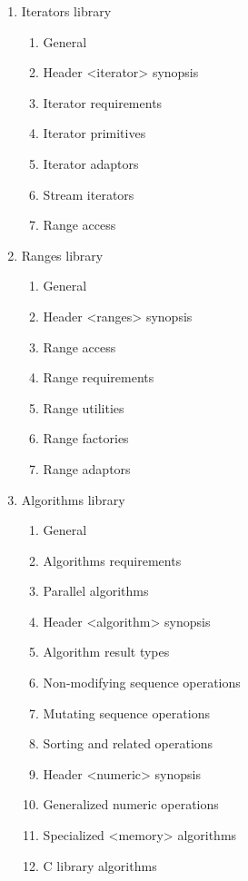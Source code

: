 \begin{enumerate}
\begin{enumerate}[label=\arabic{enumi}.\arabic*.]
     \end{enumerate}
\item Iterators library
    \begin{enumerate}[label=\arabic{enumi}.\arabic*.]
      \item General 
      \item Header <iterator> synopsis
      \item Iterator requirements 
      \item Iterator primitives 
      \item  Iterator adaptors 
      \item Stream iterators 
      \item  Range access
     \end{enumerate}
\item Ranges library
    \begin{enumerate}[label=\arabic{enumi}.\arabic*.]
      \item General       
      \item Header <ranges> synopsis
      \item Range access 
      \item Range requirements 
      \item Range utilities 
      \item Range factories 
      \item Range adaptors
     \end{enumerate}
\item Algorithms library
    \begin{enumerate}[label=\arabic{enumi}.\arabic*.]
      \item  General 
      \item  Algorithms requirements 
      \item Parallel algorithms 
      \item Header <algorithm> synopsis 
      \item Algorithm result types 
      \item Non-modifying sequence operations
      \item  Mutating sequence operations 
      \item Sorting and related operations 
      \item Header <numeric> synopsis 
      \item Generalized numeric operations 
      \item Specialized <memory> algorithms 
      \item C library algorithms
     \end{enumerate}
\end{enumerate}      
      
      
      
      
      
      
      